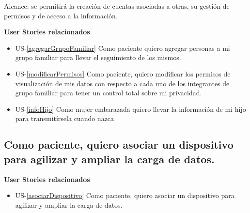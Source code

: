     Alcance: se permitirá la creación de cuentas asociadas a otras, su gestión de permisos y de acceso a la información.
    
        \textbf{User Stories relacionados}
        \begin{itemize}
			
			\item US-\ref{agregarGrupoFamiliar} Como paciente quiero agregar personas a mi grupo familiar para llevar el seguimiento de los mismos.
			\item US-\ref{modificarPermisos} Como paciente, quiero modificar los permisos de visualización de mis datos con respecto a  cada uno de los integrantes de grupo familiar para tener un control total sobre mi privacidad.
			\item US-\ref{infoHijo} Como mujer embarazada quiero llevar la información de mi hijo para transmitírsela cuando nazca
		\end{itemize}
        

\subsection{Como paciente, quiero asociar un dispositivo para agilizar y ampliar la carga de datos.}

		\textbf{User Stories relacionados}
		\begin{itemize}
			\item US-\ref{asociarDispositivo} Como paciente, quiero asociar un dispositivo para agilizar y ampliar la carga de datos.
		\end{itemize}
        
        


